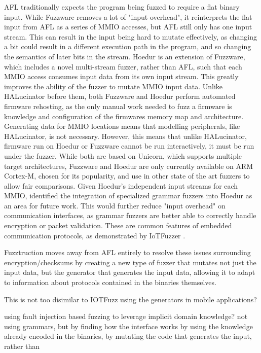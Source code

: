 \documentclass[../report.tex]{subfiles}
\begin{document}
AFL traditionally expects the program being fuzzed to require a flat binary input.
While Fuzzware removes a lot of "input overhead", it reinterprets the flat
input from AFL as a series of MMIO accesses, but AFL still only has one input
stream. This can result in the input being hard to mutate effectively, as
changing a bit could result in a different execution path in the program, and
so changing the semantics of later bits in the stream.
Hoedur \citep{Hoedur_2023} is an extension of Fuzzware, which includes a novel
multi-stream fuzzer, rather than AFL, such that each MMIO access consumes input
data from its own input stream. This greatly improves the ability of the fuzzer
to mutate MMIO input data. Unlike HALucinator before them, both Fuzzware and
Hoedur perform automated firmware rehosting, as the only manual work needed to
fuzz a firmware is knowledge and configuration of the firmwares memory map and
architecture. Generating data for MMIO locations means that modelling
peripherals, like HALucinator, is not necessary. However, this means that
unlike HALucinator, firmware run on Hoedur or Fuzzware cannot be run
interactively, it must be run under the fuzzer. While both are based on
Unicorn, which supports multiple target architectures, Fuzzware and Hoedur are
only currently available on ARM Cortex-M, chosen for its popularity, and use in
other state of the art fuzzers to allow fair comparisons. Given Hoedur's
independent input streams for each MMIO, \citet{Hoedur_2023} identified the
integration of specialized grammar fuzzers into Hoedur as an area for future
work. This would further reduce "input overhead" on communication interfaces,
as grammar fuzzers are better able to correctly handle encryption or packet
validation. These are common features of embedded communication protocols, as
demonstrated by IoTFuzzer \citep{IOTFuzzer_2018}.

Fuzztruction \citep{Fuzztruction_2023} moves away from AFL entirely to resolve
these issues surrounding encryption/checksums by creating a new type of fuzzer
that mutates not just the input data, but the generator that generates the
input data, allowing it to adapt to information about protocols contained in
the binaries themselves.

This is not too disimilar to IOTFuzz using the
generators in mobile applications?

\citet{Fuzztruction_2023} using fault injection based fuzzing to leverage implicit domain knowledge? not using grammars, but by finding how the interface works by using the knowledge already encoded in the binaries, by mutating the code that generates the input, rather than
\end{document}
